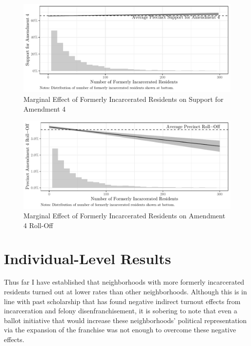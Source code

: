 \documentclass[
  12pt,
]{article}
\begin{document}
\begin{figure}[H]

{\centering \includegraphics{amendment_4_turnout_files/figure-latex/marg-alt-1} 

}

\caption{\label{fig:marg-alt}Marginal Effect of Formerly Incarcerated Residents on Support for Amendment 4}\label{fig:marg-alt}
\end{figure}
\begin{figure}[H]

{\centering \includegraphics{amendment_4_turnout_files/figure-latex/marg-alt2-1} 

}

\caption{\label{fig:marg-alt2}Marginal Effect of Formerly Incarcerated Residents on Amendment 4 Roll-Off}\label{fig:marg-alt2}
\end{figure}

\hypertarget{individual-level-results}{%
\section*{Individual-Level Results}\label{individual-level-results}}

Thus far I have established that neighborhoods with more formerly incarcerated residents turned out at lower rates than other neighborhoods. Although this is in line with past scholarship that has found negative indirect turnout effects from incarceration and felony disenfranchisement, it is sobering to note that even a ballot initiative that would increase these neighborhoods' political representation via the expansion of the franchise was not enough to overcome these negative effects.
\end{document}
